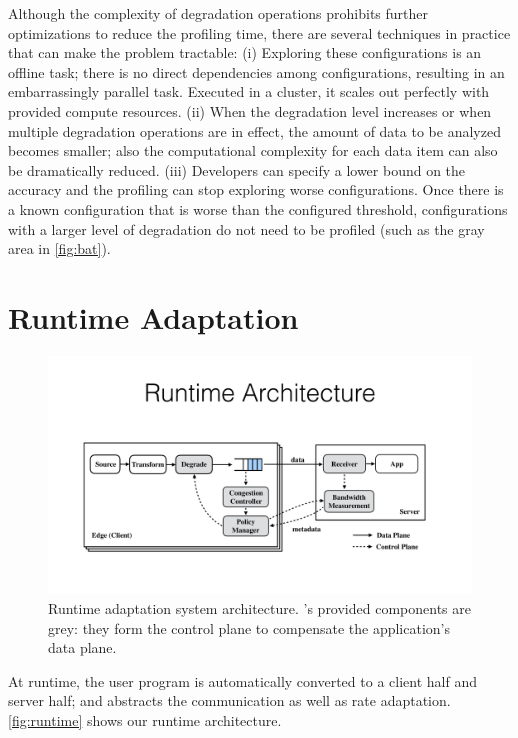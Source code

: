 Although the complexity of degradation operations prohibits further
optimizations to reduce the profiling time, there are several techniques in
practice that can make the problem tractable: (i) Exploring these configurations
is an offline task; there is no direct dependencies among configurations,
resulting in an embarrassingly parallel task. Executed in a cluster, it scales
out perfectly with provided compute resources. (ii) When the degradation level
increases or when multiple degradation operations are in effect, the amount of
data to be analyzed becomes smaller; also the computational complexity for each
data item can also be dramatically reduced. (iii) Developers can specify a lower
bound on the accuracy and the profiling can stop exploring worse configurations.
Once there is a known configuration that is worse than the configured threshold,
configurations with a larger level of degradation do not need to be profiled
(such as the gray area in \autoref{fig:bat}).

\section{Runtime Adaptation}
\label{sec:adaptation}

\begin{figure}
  \centering
  \includegraphics[width=\linewidth]{figures/runtime.pdf}
  \caption{Runtime adaptation system architecture. \sysname{}'s provided
    components are grey: they form the control plane to compensate the
    application's data plane.}
  \label{fig:runtime}
\end{figure}

 At runtime, the user program is automatically converted to a
client half and server half; and \sysname{} abstracts the communication as well
as rate adaptation. \autoref{fig:runtime} shows our runtime architecture.

